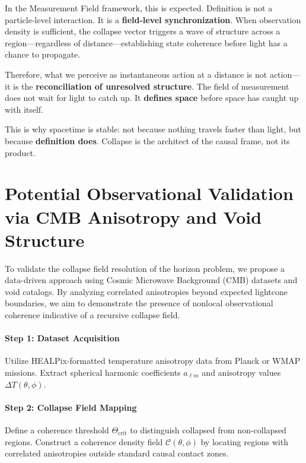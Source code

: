 In the Measurement Field framework, this is expected. Definition is not a particle-level interaction. It is a \textbf{field-level synchronization}. When observation density is sufficient, the collapse vector triggers a wave of structure across a region---regardless of distance---establishing state coherence before light has a chance to propagate.

Therefore, what we perceive as instantaneous action at a distance is not action---it is the \textbf{reconciliation of unresolved structure}. The field of measurement does not wait for light to catch up. It \textbf{defines space} before space has caught up with itself.

This is why spacetime is stable: not because nothing travels faster than light, but because \textbf{definition does}. Collapse is the architect of the causal frame, not its product.


\section{Potential Observational Validation via CMB Anisotropy and Void Structure}\cite{emergent_field_core, entanglement_structure, quantum_thermo_laws, thermalization_dynamics, blackhole_collapse_links}

To validate the collapse field resolution of the horizon problem, we propose a data-driven approach using Cosmic Microwave Background (CMB) datasets and void catalogs. By analyzing correlated anisotropies beyond expected lightcone boundaries, we aim to demonstrate the presence of nonlocal observational coherence indicative of a recursive collapse field.

\paragraph{Step 1: Dataset Acquisition}
Utilize HEALPix-formatted temperature anisotropy data from Planck or WMAP missions. Extract spherical harmonic coefficients \( a_{\ell m} \) and anisotropy values \( \Delta T(\theta, \phi) \).

\paragraph{Step 2: Collapse Field Mapping}
Define a coherence threshold \( \Theta_{\text{crit}} \) to distinguish collapsed from non-collapsed regions. Construct a coherence density field \( \mathcal{C}(\theta, \phi) \) by locating regions with correlated anisotropies outside standard causal contact zones. 

